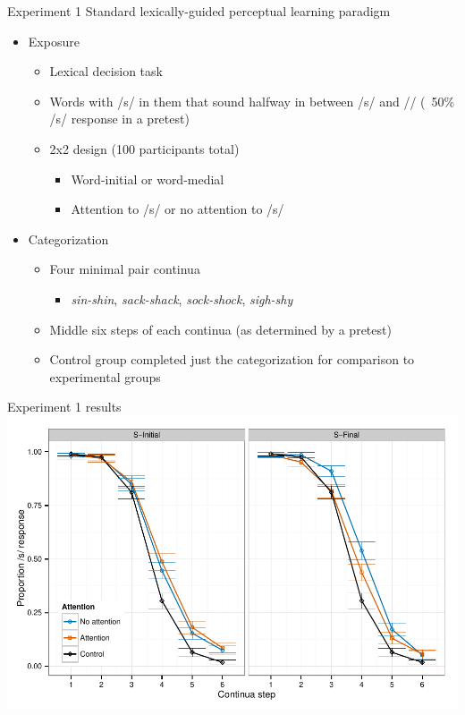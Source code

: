 \documentclass{beamer}
\begin{document}
\begin{frame}{Experiment 1}
Standard lexically-guided perceptual learning paradigm
\begin{itemize}
\item Exposure
\begin{itemize}
\item Lexical decision task
\item Words with /s/ in them that sound halfway in between /s/ and /\textesh/ (~50\% /s/ response in a pretest) 
\item 2x2 design (100 participants total)
\begin{itemize}
\item Word-initial or word-medial
\item Attention to /s/ or no attention to /s/
\end{itemize}
\end{itemize}
\item Categorization
\begin{itemize}
\item Four minimal pair continua
\begin{itemize}
\item \emph{sin-shin}, \emph{sack-shack}, \emph{sock-shock}, \emph{sigh-shy} 
\end{itemize}
\item Middle six steps of each continua (as determined by a pretest) 
\item Control group completed just the categorization for comparison to experimental groups
\end{itemize}
\end{itemize}
\end{frame}

\begin{frame}{Experiment 1 results}
\includegraphics[width=\textwidth]{graphs/exp1_categresults_present.pdf}
\end{frame}
\end{document}
